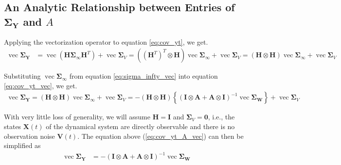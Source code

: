 \documentclass{article}
\begin{document}
\subsection*{An Analytic Relationship between Entries of $\mathbf{\Sigma_Y}$ and $A$}
Applying the vectorization operator to equation \ref{eq:cov_yt}, we get.
\begin{equation}
\begin{aligned}
\operatorname{vec} \mathbf{\Sigma_Y} &= \operatorname{vec} (\mathbf{H} \mathbf{\Sigma}_\mathbf{\infty} \mathbf{H}^T) + \operatorname{vec} \mathbf{\Sigma}_V =\left( (\mathbf{H}^T)^T \otimes \mathbf{H} \right)\operatorname{vec} \mathbf{\Sigma}_\mathbf{\infty} + \operatorname{vec} \mathbf{\Sigma}_V =\left(\mathbf{H} \otimes \mathbf{H} \right)\operatorname{vec} \mathbf{\Sigma}_\mathbf{\infty} + \operatorname{vec} \mathbf{\Sigma}_V
\end{aligned}
\label{eq:cov_yt_vec}
\end{equation}


Substituting $\operatorname{vec} \mathbf{\Sigma}_\infty$ from equation \ref{eq:sigma_infty_vec} into equation \ref{eq:cov_yt_vec}, we get.
\begin{equation}
\begin{aligned}
\operatorname{vec} \mathbf{\Sigma_Y} =\left(\mathbf{H} \otimes \mathbf{H} \right) \operatorname{vec} \mathbf{\Sigma}_\mathbf{\infty} + \operatorname{vec} \mathbf{\Sigma}_V =-\left(\mathbf{H} \otimes \mathbf{H} \right) \left \{ {(\mathbf{I} \otimes \mathbf{A} + \mathbf{A} \otimes \mathbf{I})}^{-1} \operatorname{vec}\mathbf{\Sigma}_\mathbf{W} \right \} + \operatorname{vec} \mathbf{\Sigma}_V
\end{aligned}
\label{eq:cov_yt_A_vec}
\end{equation}


With very little loss of generality, we will assume $\mathbf{H}=\mathbf{I}$ and $\mathbf{\Sigma}_V=\mathbf{0}$, i.e., the states $\mathbf{X}(t)$ of the dynamical system are directly observable and there is no observation noise $\mathbf{V} (t)$. The equation above (\ref{eq:cov_yt_A_vec}) can then be simplified as
\begin{equation}
\begin{aligned}
\operatorname{vec} \mathbf{\Sigma_Y} &=- {(\mathbf{I} \otimes \mathbf{A} + \mathbf{A} \otimes \mathbf{I})}^{-1} \operatorname{vec} \mathbf{\Sigma}_\mathbf{W}
\end{aligned}
\label{eq:cov_yt_A_vec1}
\end{equation}
\end{document}
